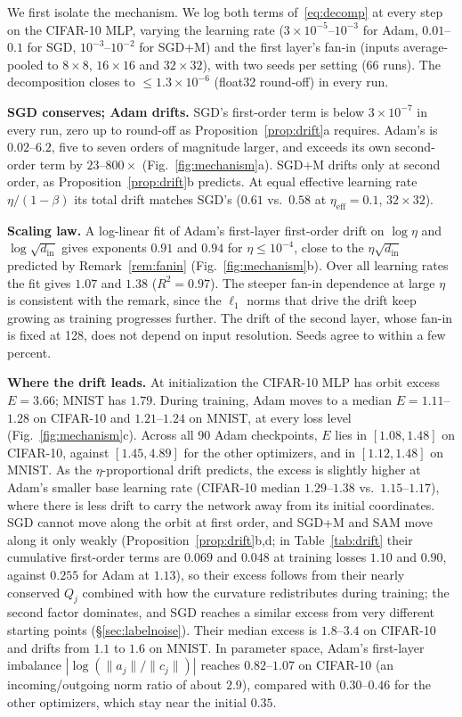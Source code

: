 \documentclass[10pt]{article}
\theoremstyle{remark}
\begin{document}
We first isolate the mechanism. We log both terms of~\eqref{eq:decomp} at every step on the CIFAR-10 MLP, varying the learning rate ($3{\times}10^{-5}$--$10^{-3}$ for Adam, $0.01$--$0.1$ for SGD, $10^{-3}$--$10^{-2}$ for SGD+M) and the first layer's fan-in (inputs average-pooled to $8{\times}8$, $16{\times}16$ and $32{\times}32$), with two seeds per setting (66 runs). The decomposition closes to $\le1.3{\times}10^{-6}$ (float32 round-off) in every run.

\textbf{SGD conserves; Adam drifts.} SGD's first-order term is below $3{\times}10^{-7}$ in every run, zero up to round-off as Proposition~\ref{prop:drift}a requires. Adam's is $0.02$--$6.2$, five to seven orders of magnitude larger, and exceeds its own second-order term by $23$--$800\times$ (Fig.~\ref{fig:mechanism}a). SGD+M drifts only at second order, as Proposition~\ref{prop:drift}b predicts. At equal effective learning rate $\eta/(1-\beta)$ its total drift matches SGD's ($0.61$ vs.\ $0.58$ at $\eta_{\mathrm{eff}}=0.1$, $32{\times}32$).

\textbf{Scaling law.} A log-linear fit of Adam's first-layer first-order drift on $\log\eta$ and $\log\sqrt{d_{\mathrm{in}}}$ gives exponents $0.91$ and $0.94$ for $\eta\le10^{-4}$, close to the $\eta\sqrt{d_{\mathrm{in}}}$ predicted by Remark~\ref{rem:fanin} (Fig.~\ref{fig:mechanism}b). Over all learning rates the fit gives $1.07$ and $1.38$ ($R^2=0.97$). The steeper fan-in dependence at large $\eta$ is consistent with the remark, since the $\ell_1$ norms that drive the drift keep growing as training progresses further. The drift of the second layer, whose fan-in is fixed at 128, does not depend on input resolution. Seeds agree to within a few percent.

\textbf{Where the drift leads.} At initialization the CIFAR-10 MLP has orbit excess $E=3.66$; MNIST has $1.79$. During training, Adam moves to a median $E=1.11$--$1.28$ on CIFAR-10 and $1.21$--$1.24$ on MNIST, at every loss level (Fig.~\ref{fig:mechanism}c). Across all 90 Adam checkpoints, $E$ lies in $[1.08,1.48]$ on CIFAR-10, against $[1.45,4.89]$ for the other optimizers, and in $[1.12,1.48]$ on MNIST. As the $\eta$-proportional drift predicts, the excess is slightly higher at Adam's smaller base learning rate (CIFAR-10 median $1.29$--$1.38$ vs.\ $1.15$--$1.17$), where there is less drift to carry the network away from its initial coordinates. SGD cannot move along the orbit at first order, and SGD+M and SAM move along it only weakly (Proposition~\ref{prop:drift}b,d; in Table~\ref{tab:drift} their cumulative first-order terms are $0.069$ and $0.048$ at training losses $1.10$ and $0.90$, against $0.255$ for Adam at $1.13$), so their excess follows from their nearly conserved $Q_j$ combined with how the curvature redistributes during training; the second factor dominates, and SGD reaches a similar excess from very different starting points (\S\ref{sec:labelnoise}). Their median excess is $1.8$--$3.4$ on CIFAR-10 and drifts from $1.1$ to $1.6$ on MNIST. In parameter space, Adam's first-layer imbalance $|\log(\|a_j\|/\|c_j\|)|$ reaches $0.82$--$1.07$ on CIFAR-10 (an incoming/outgoing norm ratio of about $2.9$), compared with $0.30$--$0.46$ for the other optimizers, which stay near the initial $0.35$.
\end{document}
